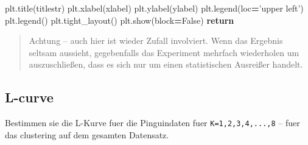 \documentclass[]{book}
\newenvironment{Shaded}{\begin{snugshade}}{\end{snugshade}}
\newcommand{\ControlFlowTok}[1]{\textcolor[rgb]{0.13,0.29,0.53}{\textbf{#1}}}
\newcommand{\NormalTok}[1]{#1}
\newcommand{\OperatorTok}[1]{\textcolor[rgb]{0.81,0.36,0.00}{\textbf{#1}}}
\newcommand{\StringTok}[1]{\textcolor[rgb]{0.31,0.60,0.02}{#1}}
\newcommand{\VariableTok}[1]{\textcolor[rgb]{0.00,0.00,0.00}{#1}}
\newenvironment {JHSAYS} [0] {\begin{quote}\color{jhsc}} {\end{quote}}
\theoremstyle{definition}
\theoremstyle{definition}
\theoremstyle{definition}
\theoremstyle{definition}
\theoremstyle{remark}
\begin{document}
\begin{Shaded}
\begin{Highlighting}[]
\NormalTok{    plt.title(titlestr)}
\NormalTok{    plt.xlabel(xlabel)}
\NormalTok{    plt.ylabel(ylabel)}
\NormalTok{    plt.legend(loc}\OperatorTok{=}\StringTok{'upper left'}\NormalTok{)}
\NormalTok{    plt.legend()}
\NormalTok{    plt.tight_layout()}
\NormalTok{    plt.show(block}\OperatorTok{=}\VariableTok{False}\NormalTok{)}
    \ControlFlowTok{return}
\end{Highlighting}
\end{Shaded}

\leavevmode\hypertarget{clustering-random}{}%
\begin{JHSAYS}
Achtung -- auch hier ist wieder Zufall involviert. Wenn das Ergebnis seltsam aussieht, gegebenfalls das Experiment mehrfach wiederholen um auszuschließen, dass es sich nur um einen statistischen Ausreißer handelt.

\end{JHSAYS}

\hypertarget{l-curve}{%
\subsection{L-curve}\label{l-curve}}

Bestimmen sie die L-Kurve fuer die Pinguindaten fuer \texttt{K=1,2,3,4,...,8} -- fuer das clustering auf dem gesamten Datensatz.
\end{document}
